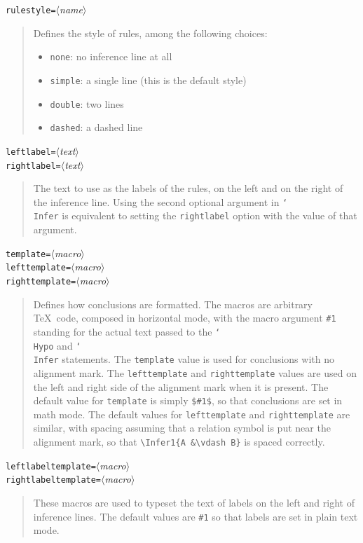 \documentclass{article}
\newcommand\lit[1]{\texttt{#1}}
\newcommand\cs[1]{\lit{\char`\\#1}}
\newcommand\env[1]{\lit{#1}}
\newcommand\opt[1]{\lit{#1}}
\newcommand\meta[1]{$\langle$\textit{#1}$\rangle$}
\newenvironment{csdoc}[1]{%
  \begin{flushleft}#1\end{flushleft}%
  \begin{quote}%
}{%
  \end{quote}%
}
\begin{document}
\begin{csdoc}{\opt{rulestyle=}\meta{name}}
  Defines the style of rules, among the following choices:
  \begin{itemize}
  \item \opt{none}: no inference line at all
  \item \opt{simple}: a single line (this is the default style)
  \item \opt{double}: two lines
  \item \opt{dashed}: a dashed line
  \end{itemize}
\end{csdoc}
\begin{csdoc}{
    \opt{leftlabel=}\meta{text} \\
    \opt{rightlabel=}\meta{text}}
  The text to use as the labels of the rules, on the left and on the right
  of the inference line.
  Using the second optional argument in \cs{Infer} is equivalent to setting
  the \env{rightlabel} option with the value of that argument.
\end{csdoc}
\begin{csdoc}{
    \opt{template=}\meta{macro} \\
    \opt{lefttemplate=}\meta{macro} \\
    \opt{righttemplate=}\meta{macro}}
  Defines how conclusions are formatted.
  The macros are arbitrary \TeX\ code, composed in horizontal mode, with the
  macro argument \verb|#1| standing for the actual text passed to the
  \cs{Hypo} and \cs{Infer} statements.
  The \opt{template} value is used for conclusions with no alignment mark.
  The \opt{lefttemplate} and \opt{righttemplate} values are used on the left
  and right side of the alignment mark when it is present.
  The default value for \opt{template} is simply \verb|$#1$|, so that
  conclusions are set in math mode.
  The default values for \opt{lefttemplate} and \opt{righttemplate} are
  similar, with spacing assuming that a relation symbol is put near the
  alignment mark, so that \verb|\Infer1{A &\vdash B}| is spaced correctly.
\end{csdoc}
\begin{csdoc}{
    \opt{leftlabeltemplate=}\meta{macro} \\
    \opt{rightlabeltemplate=}\meta{macro}}
  These macros are used to typeset the text of labels on the left and right of
  inference lines.
  The default values are \verb|#1| so that labels are set in plain text mode.
\end{csdoc}
\end{document}
